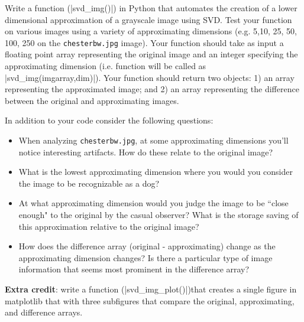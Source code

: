 \documentclass[11pt,letterpaper]{article}
\begin{document}
\begin{assignment}
Write a function (|svd_img()|) in Python that automates the creation of a lower dimensional approximation of a grayscale image using SVD.  Test your function on various images using a variety of approximating dimensions (e.g. 5,10, 25, 50, 100, 250 on the \texttt{chesterbw.jpg} image).  Your function should take as input a floating point array representing the original image and an integer specifying the approximating dimension (i.e. function will be called as |svd_img(imgarray,dim)|). Your function should return two objects: 1) an array representing the approximated image; and 2) an array representing the difference between the original and approximating images.

In addition to your code consider the following questions:

\begin{itemize}
\item When analyzing \texttt{chesterbw.jpg}, at some approximating dimensions you'll notice interesting artifacts. How do these relate to the original image? 

\item What is the lowest approximating dimension where you would you consider the image to be recognizable as a dog?
 
\item At what approximating dimension would you judge the  image to be ``close enough"  to the original by the casual observer? What is the storage saving of this approximation relative to the original image?

\item How does the difference array (original - approximating) change as the approximating dimension changes? Is there a particular type of image information that seems most prominent in the difference array?
\end{itemize}

\textbf{Extra credit}: write a function (|svd_img_plot()|)that creates a single figure in matplotlib that with three subfigures that compare the original, approximating, and difference arrays. 

\end{assignment}
\end{document}
